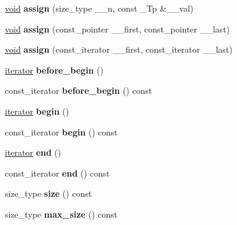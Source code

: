 \begin{DoxyCompactItemize}
\item 
\mbox{\label{classslist_aa2ef0d950a31af4cd1a9c0e3159b01f0}} 
\hyperlink{interfacevoid}{void} {\bfseries assign} (size\+\_\+type \+\_\+\+\_\+n, const \+\_\+\+Tp \&\+\_\+\+\_\+val)
\item 
\mbox{\label{classslist_a5f6926cbd444f6396b046476a97c6b8c}} 
\hyperlink{interfacevoid}{void} {\bfseries assign} (const\+\_\+pointer \+\_\+\+\_\+first, const\+\_\+pointer \+\_\+\+\_\+last)
\item 
\mbox{\label{classslist_aa2d9bf7cc0cb5d03de338e88b4e0e0e1}} 
\hyperlink{interfacevoid}{void} {\bfseries assign} (const\+\_\+iterator \+\_\+\+\_\+first, const\+\_\+iterator \+\_\+\+\_\+last)
\item 
\mbox{\label{classslist_a86d9b1c038344d26088832ea596334eb}} 
\hyperlink{structiterator}{iterator} {\bfseries before\+\_\+begin} ()
\item 
\mbox{\label{classslist_a9eaf3d9bcf4e8d8597b7e1affd3539a6}} 
const\+\_\+iterator {\bfseries before\+\_\+begin} () const
\item 
\mbox{\label{classslist_addbe19c1fcf1da5e4d568e6c540dd389}} 
\hyperlink{structiterator}{iterator} {\bfseries begin} ()
\item 
\mbox{\label{classslist_aa4bd0497b4c144f95e9390c91d900af2}} 
const\+\_\+iterator {\bfseries begin} () const
\item 
\mbox{\label{classslist_a1297a8893ee7d714abffb8908fbf1aed}} 
\hyperlink{structiterator}{iterator} {\bfseries end} ()
\item 
\mbox{\label{classslist_a065e80e73715daef372a1cc38ac7c2d4}} 
const\+\_\+iterator {\bfseries end} () const
\item 
\mbox{\label{classslist_a45de1df63fad9e19bc251e872e71db29}} 
size\+\_\+type {\bfseries size} () const
\item 
\mbox{\label{classslist_a5bb3af824c80a5ad9669af7d28dc64a2}} 
size\+\_\+type {\bfseries max\+\_\+size} () const

\end{DoxyCompactItemize}
